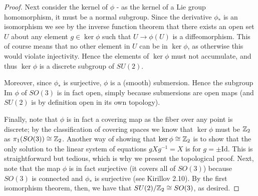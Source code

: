 \documentclass{../../mathnotes}
\begin{document}
\begin{proof}
    Next consider the kernel of $\phi$ - as the kernel of a Lie group homomorphism, it must be a normal subgroup. 
    Since the derivative $\phi_*$ is an isomorphism we see by the inverse function theorem that there exists an open set $U$
    about any element $g\in\ker\phi$ such that $U\to\phi(U)$ is a diffeomorphism. This of course means that no other element
    in $U$ can be in $\ker\phi$, as otherwise this would violate injectivity. Hence the elements of $\ker\phi$ must not accumulate,
    and thus $\ker\phi$ is a discrete subgroup of $SU(2)$.

    Moreover, since $\phi_*$ is surjective, $\phi$ is a (smooth) submersion. Hence the subgroup $\text{Im }\phi$ of $SO(3)$
    is in fact open, simply because submersions are open maps (and $SU(2)$ is by definition open in its own topology).

    Finally, note that $\phi$ is in fact a covering map as the fiber over any point is discrete; by the classification of covering spaces
    we know that $\ker\phi$ must be $\mathbb{Z}_2$ as $\pi_1(SO(3))\cong\mathbb{Z}_2$. Another way of showing that $\ker\phi\cong \mathbb{Z}_2$ is to
    show that the only solution to the linear system of equations $gXg^{-1}=X$ is for $g=\pm \text{Id}$. This is straightforward but tedious, which
    is why we present the topological proof. Next, note that the map $\phi$ is in fact surjective (it covers all of $SO(3)$) because $SO(3)$ is connected
    and $\phi_*$ is surjective (see Kirillov 2.10). By the first isomorphism theorem, then, we have that $SU(2)/\mathbb{Z}_2\cong SO(3)$, as desired.
\end{proof}
\end{document}
